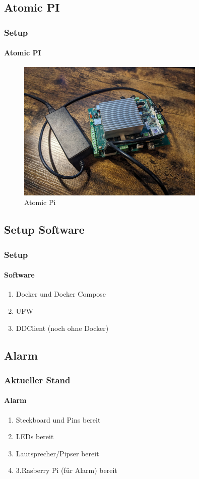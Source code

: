 \documentclass[]{beamer}
\begin{document}
\subsection{Atomic PI}
\begin{frame}
	\frametitle{Setup}
	\framesubtitle{Atomic PI}
	\begin{figure}
		\centering
		\begin{minipage}[t]{1\textwidth}
			\centering
			\includegraphics[width=0.8\textwidth]{Images/AtomicPi.jpg}
		\end{minipage}
		\caption{Atomic Pi}
		\label{fig:Atomic Pi}
	\end{figure}
\end{frame}



\subsection{Setup Software}
\begin{frame}
	\frametitle{Setup}
	\framesubtitle{Software}

	\begin{enumerate}
		\item Docker und Docker Compose
		\item UFW
		\item DDClient (noch ohne Docker)
	\end{enumerate}
\end{frame}

\subsection{Alarm}
\begin{frame}
	\frametitle{Aktueller Stand}
	\framesubtitle{Alarm}
	\begin{enumerate}
	    \item Steckboard und Pins bereit
		\item LEDs bereit
		\item Lautsprecher/Pipser bereit
		\item 3.Rasberry Pi (für Alarm) bereit
	\end{enumerate}
\end{frame}
\end{document}
